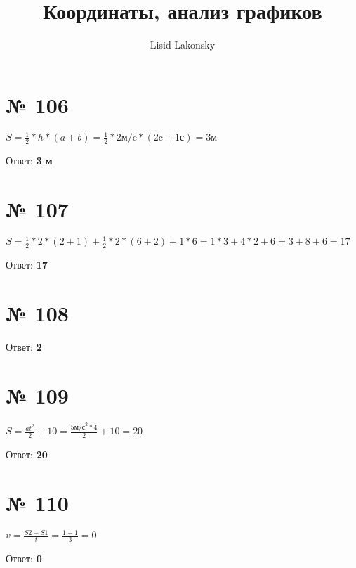 \documentclass[11pt]{article} %
\title{Координаты, анализ графиков}
\author{Lisid Lakonsky}
\begin{document}
\maketitle

\section{№ \textbf{106}}

$ S = \frac{1}{2} * h * (a + b) = \frac{1}{2} * 2 \text{м/c} * (2 \text{c} + 1 \text{с}) = 3 \text{м} $ 

Ответ: \textbf{3 м}

\section{№ \textbf{107}}

$ S = \frac{1}{2} * 2 * (2 + 1) + \frac{1}{2} * 2 * (6 + 2) + 1 * 6 = 1 * 3 + 4 * 2 + 6 = 3 + 8 + 6 = 17 $

Ответ: \textbf{17}

\section{№ \textbf{108}}

Ответ: \textbf{2}

\section{№ \textbf{109}}

$ S = \frac{at^2}{2} + 10 = \frac{5 \text{м/с}^2 * 4}{2} + 10 = 20 $

Ответ: \textbf{20}

\section{№ \textbf{110}}

$ v = \frac{S2 - S1}{t} = \frac{1 - 1}{3} = 0 $

Ответ: \textbf{0}
\end{document}
